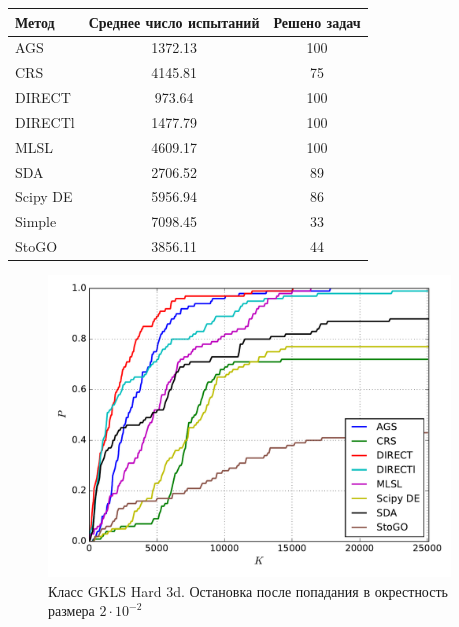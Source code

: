 \documentclass[a4paper]{article}
\begin{document}
\begin{tabular}{lcc}
\hline
 Метод    &  Среднее число испытаний  &  Решено задач  \\
\hline
 AGS      &          1372.13          &      100       \\
 CRS      &          4145.81          &       75       \\
 DIRECT   &          973.64           &      100       \\
 DIRECTl  &          1477.79          &      100       \\
 MLSL     &          4609.17          &      100       \\
 SDA      &          2706.52          &       89       \\
 Scipy DE &          5956.94          &       86       \\
 Simple   &          7098.45          &       33       \\
 StoGO    &          3856.11          &       44       \\
\hline
\end{tabular}
\begin{figure}[H]
  \center
  \includegraphics[width=0.95\textwidth]{../experiments/gklsh3d/cmc.pdf}
  \caption{Класс GKLS Hard 3d. Остановка после попадания в окрестность размера $2\cdot10^{-2}$}
  \label{fig:}
\end{figure}
\end{document}

